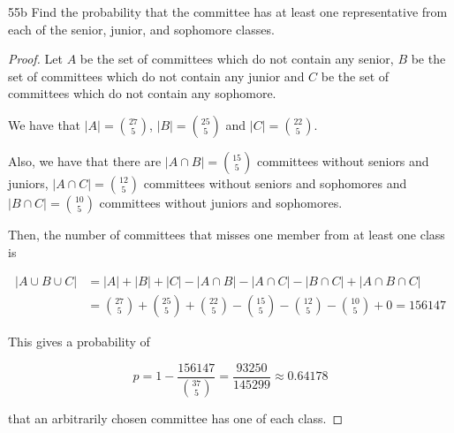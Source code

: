 \begin{exercise}{55b}
    Find the probability that the committee has at least one representative from each of the senior, junior, and sophomore classes.
\end{exercise}

\begin{proof}
    Let $A$ be the set of committees which do not contain any senior, $B$ be the set of committees which do not contain any junior and $C$ be the set of committees which do not contain any sophomore.

    We have that $|A| = {27 \choose 5}$, $|B| = {25 \choose 5}$ and $|C| = {22 \choose 5}$.

    Also, we have that there are $|A \cap B| = {15 \choose 5}$ committees without seniors and juniors, $|A \cap C| = {12 \choose 5}$ committees without seniors and sophomores and $|B \cap C| = {10 \choose 5}$ committees without juniors and sophomores.

    Then, the number of committees that misses one member from at least one class is

    \begin{align*}
        |A \cup B \cup C| &= |A| + |B| + |C| - |A \cap B| - |A \cap C| - |B \cap C| + |A \cap B \cap C|\\
        &= {27 \choose 5}+ {25 \choose 5}+ {22 \choose 5} - {15 \choose 5} - {12 \choose 5} - {10 \choose 5} +0= 156147
    \end{align*}
    $$$$

    This gives a probability of

    $$p = 1-\frac{156147}{{37 \choose 5}} = \frac{93250}{145299} \approx 0.64178$$

    that an arbitrarily chosen committee has one of each class.
    
    \end{proof}

